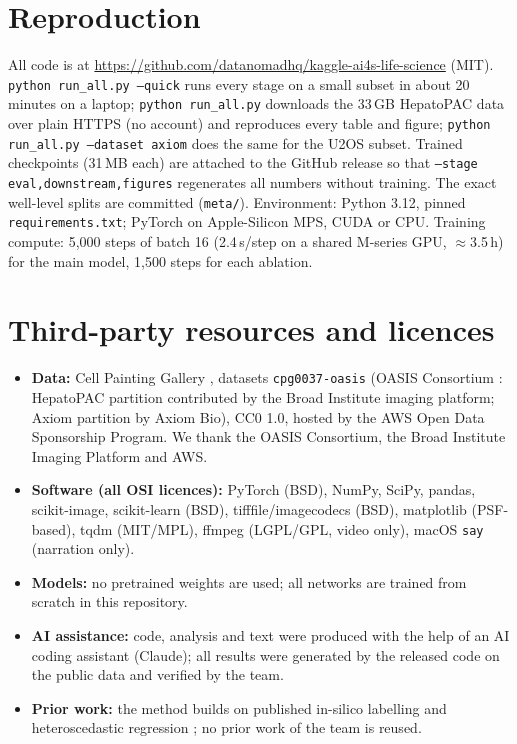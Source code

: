 \documentclass[11pt,a4paper]{article}
\begin{document}
\section{Reproduction}
\label{sec:reproduction}
All code is at \url{https://github.com/datanomadhq/kaggle-ai4s-life-science} (MIT). \texttt{python run\_all.py --quick} runs every stage on a small subset in about 20 minutes on a laptop; \texttt{python run\_all.py} downloads the 33\,GB HepatoPAC data over plain HTTPS (no account) and reproduces every table and figure; \texttt{python run\_all.py --dataset axiom} does the same for the U2OS subset. Trained checkpoints (31\,MB each) are attached to the GitHub release so that \texttt{--stage eval,downstream,figures} regenerates all numbers without training. The exact well-level splits are committed (\texttt{meta/}). Environment: Python 3.12, pinned \texttt{requirements.txt}; PyTorch on Apple-Silicon MPS, CUDA or CPU. Training compute: 5,000 steps of batch 16 (2.4\,s/step on a shared M-series GPU, $\approx$3.5\,h) for the main model, 1,500 steps for each ablation.

\section{Third-party resources and licences}
\label{sec:licences}
\begin{itemize}
\item \textbf{Data:} Cell Painting Gallery \cite{weisbart2024}, datasets \texttt{cpg0037-oasis} (OASIS Consortium \cite{oasis2025}: HepatoPAC partition contributed by the Broad Institute imaging platform; Axiom partition by Axiom Bio), CC0 1.0, hosted by the AWS Open Data Sponsorship Program. We thank the OASIS Consortium, the Broad Institute Imaging Platform and AWS.
\item \textbf{Software (all OSI licences):} PyTorch (BSD), NumPy, SciPy, pandas, scikit-image, scikit-learn (BSD), tifffile/imagecodecs (BSD), matplotlib (PSF-based), tqdm (MIT/MPL), ffmpeg (LGPL/GPL, video only), macOS \texttt{say} (narration only).
\item \textbf{Models:} no pretrained weights are used; all networks are trained from scratch in this repository.
\item \textbf{AI assistance:} code, analysis and text were produced with the help of an AI coding assistant (Claude); all results were generated by the released code on the public data and verified by the team.
\item \textbf{Prior work:} the method builds on published in-silico labelling \cite{christiansen2018,ounkomol2018,crosszamirski2022} and heteroscedastic regression \cite{kendall2017}; no prior work of the team is reused.
\end{itemize}
\appendix
\end{document}
